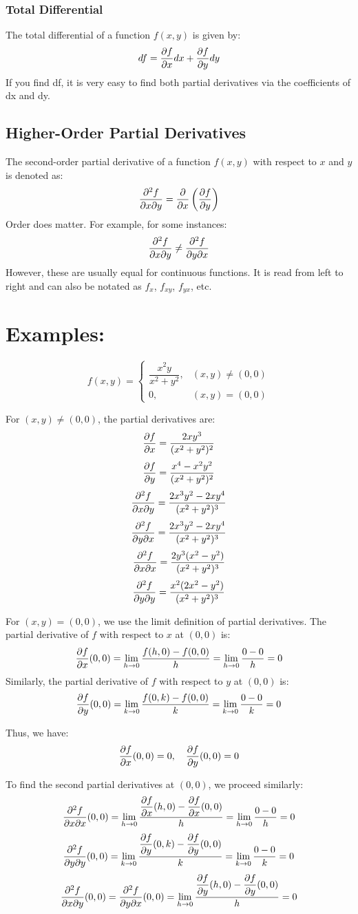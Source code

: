 \subsubsection{Total Differential}
The total differential of a function \(f(x, y)\) is given by:
\[
    df = \dfrac{\partial f}{\partial x}dx + \dfrac{\partial f}{\partial y}dy
\]
If you find df, it is very easy to find both partial derivatives via the coefficients of dx and dy.
\subsection{Higher-Order Partial Derivatives}
The second-order partial derivative of a function \(f(x, y)\) with respect to \(x\) and \(y\) is denoted as:
\[
    \dfrac{\partial^2 f}{\partial x \partial y} = \dfrac{\partial }{\partial x}\left(\dfrac{\partial f}{\partial y}\right)
\]
Order does matter. For example, for some instances: \[\dfrac{\partial^2 f}{\partial x \partial y} \neq \dfrac{\partial^2 f}{\partial y \partial x}\] However, these are usually equal for continuous functions. It is read from left to right and can also be notated as $f_x$, \(f_{xy}\), \(f_{yx}\), etc.
\pagebreak
\section{Examples:}
\[
    f(x, y) = 
    \begin{cases}
        \dfrac{x^2 y}{x^2 + y^2}, & (x, y) \neq (0, 0)\\
        0, & (x, y) = (0, 0)
    \end{cases}
\]

For \( (x, y) \neq (0, 0) \), the partial derivatives are:
\[
    \dfrac{\partial f}{\partial x} = \dfrac{2xy^3}{(x^2 + y^2)^2}
\]
\[
    \dfrac{\partial f}{\partial y} = \dfrac{x^4 - x^2 y^2}{(x^2 + y^2)^2}
\]
\[
    \dfrac{\partial^2 f}{\partial x \partial y} = \dfrac{2x^3 y^2 - 2x y^4}{(x^2 + y^2)^3}
\]
\[
    \dfrac{\partial^2 f}{\partial y \partial x} = \dfrac{2x^3 y^2 - 2x y^4}{(x^2 + y^2)^3}
\]
\[
    \dfrac{\partial^2 f}{\partial x \partial x} = \dfrac{2y^3(x^2 - y^2)}{(x^2 + y^2)^3}
\]
\[
    \dfrac{\partial^2 f}{\partial y \partial y} = \dfrac{x^2(2x^2 - y^2)}{(x^2 + y^2)^3}
\]

For \( (x, y) = (0, 0) \), we use the limit definition of partial derivatives. The partial derivative of \( f \) with respect to \( x \) at \( (0, 0) \) is:
\[
    \dfrac{\partial f}{\partial x}(0, 0) = \lim_{h \to 0} \dfrac{f(h, 0) - f(0, 0)}{h} = \lim_{h \to 0} \dfrac{0 - 0}{h} = 0
\]
Similarly, the partial derivative of \( f \) with respect to \( y \) at \( (0, 0) \) is:
\[
    \dfrac{\partial f}{\partial y}(0, 0) = \lim_{k \to 0} \dfrac{f(0, k) - f(0, 0)}{k} = \lim_{k \to 0} \dfrac{0 - 0}{k} = 0
\]

Thus, we have:
\[
    \dfrac{\partial f}{\partial x}(0, 0) = 0, \quad \dfrac{\partial f}{\partial y}(0, 0) = 0
\]

To find the second partial derivatives at \( (0, 0) \), we proceed similarly:
\[
    \dfrac{\partial^2 f}{\partial x \partial x}(0, 0) = \lim_{h \to 0} \dfrac{\dfrac{\partial f}{\partial x}(h, 0) - \dfrac{\partial f}{\partial x}(0, 0)}{h} = \lim_{h \to 0} \dfrac{0 - 0}{h} = 0
\]
\[
    \dfrac{\partial^2 f}{\partial y \partial y}(0, 0) = \lim_{k \to 0} \dfrac{\dfrac{\partial f}{\partial y}(0, k) - \dfrac{\partial f}{\partial y}(0, 0)}{k} = \lim_{k \to 0} \dfrac{0 - 0}{k} = 0
\]
\[
    \dfrac{\partial^2 f}{\partial x \partial y}(0, 0) = \dfrac{\partial^2 f}{\partial y \partial x}(0, 0) = \lim_{h \to 0} \dfrac{\dfrac{\partial f}{\partial y}(h, 0) - \dfrac{\partial f}{\partial y}(0, 0)}{h} = 0
\]

